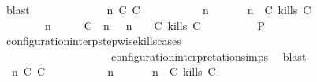 \begin{isabellebody}
\ blast\isanewline
\ \ \ \ \isamarkupfalse%
\isanewline
\ \ \ \ \ \ \isamarkupfalse%
\ {\isasymGamma}\ n\ C\ C\ {\isasymPsi}\ {\isasymPhi}\isanewline
\ \ \ \ \ \ \isamarkupfalse%
\ {\isacartoucheopen}{\isacharparenleft}{\isasymGamma}\ n\ {\isasymturnstile}\ {\isasymPsi}\ {\isasymtriangleright}\ {\isasymPhi}\ {\isacharequal}\ {\isacharparenleft}{\isasymGamma}{\isacharcomma}\ n\ {\isasymturnstile}\ {\isacharparenleft}{\isacharparenleft}C\ kills\ C\ {\isacharhash}\ {\isasymPsi}{\isacharparenright}\ {\isasymtriangleright}\ {\isasymPhi}{\isacharparenright}{\isacartoucheclose}\isanewline
\ \ \ \ \ \ \ {\isacartoucheopen}{\isacharparenleft}{\isasymGamma}\ n\ {\isasymturnstile}\ {\isasymPsi}\ {\isasymtriangleright}\ {\isasymPhi}\ {\isacharequal}\ {\isacharparenleft}{\isacharparenleft}{\isacharparenleft}C\ {\isasymnot}{\isasymUp}\ n{\isacharparenright}\ {\isacharhash}\ {\isasymGamma}{\isacharparenright}{\isacharcomma}\ n\ {\isasymturnstile}\ {\isasymPsi}\ {\isasymtriangleright}\ {\isacharparenleft}{\isacharparenleft}C\ kills\ C\ {\isacharhash}\ {\isasymPhi}{\isacharparenright}{\isacharparenright}{\isacartoucheclose}\isanewline
\ \ \ \ \ \ \isamarkupfalse%
\ {\isacharquery}P\ \isamarkupfalse%
\ configuration{\isacharunderscore}interp{\isacharunderscore}stepwise{\isacharunderscore}kills{\isacharunderscore}cases\isanewline
\ \ \ \ \ \ \ \ \ \ \ \ \ \ \ \ \ \ \ \ configuration{\isacharunderscore}interpretation{\isachardot}simps\ \isamarkupfalse%
\ blast\isanewline
\ \ \ \ \isamarkupfalse%
\isanewline
\ \ \ \ \ \ \isamarkupfalse%
\ {\isasymGamma}\ n\ C\ C\ {\isasymPsi}\ {\isasymPhi}\isanewline
\ \ \ \ \ \ \isamarkupfalse%
\ {\isacartoucheopen}{\isacharparenleft}{\isasymGamma}\ n\ {\isasymturnstile}\ {\isasymPsi}\ {\isasymtriangleright}\ {\isasymPhi}\ {\isacharequal}\ {\isacharparenleft}{\isasymGamma}{\isacharcomma}\ n\ {\isasymturnstile}\ {\isacharparenleft}{\isacharparenleft}C\ kills\ C\ {\isacharhash}\ {\isasymPsi}{\isacharparenright}\ {\isasymtriangleright}\ {\isasymPhi}{\isacharparenright}{\isacartoucheclose}\isanewline

\end{isabellebody}
